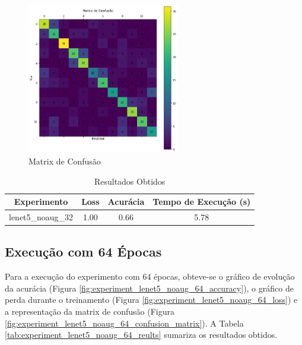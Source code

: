 \documentclass[12pt]{article}
\begin{document}
\begin{figure}[!htb]
  \centering
  \includegraphics[width=18em]{experiments/lenet5_noaug_32/confusion_matrix.png}
  \caption{Matrix de Confusão}
  \label{fig:experiment_lenet5_noaug_32_confusion_matrix}
\end{figure}

\begin{table}[!htb]
  \centering
  \begin{tabular}{|c|c|c|c|}
    \hline
    \textbf{Experimento} & \textbf{Loss} & \textbf{Acurácia} & \textbf{Tempo de Execução (s)} \\ \hline
    lenet5\_noaug\_32    & 1.00          & 0.66              & 5.78                           \\ \hline
  \end{tabular}
  \caption{Resultados Obtidos}
  \label{tab:experiment_lenet5_noaug_32_reults}
\end{table}

\newpage

\subsection{Execução com 64 Épocas}

Para a execução do experimento com 64 épocas, obteve-se o gráfico de evolução da acurácia (Figura \ref{fig:experiment_lenet5_noaug_64_accuracy}), o gráfico de perda durante o treinamento (Figura \ref{fig:experiment_lenet5_noaug_64_loss}) e a representação da matrix de confusão (Figura \ref{fig:experiment_lenet5_noaug_64_confusion_matrix}). A Tabela \ref{tab:experiment_lenet5_noaug_64_reults} sumariza os resultados obtidos.
\end{document}

